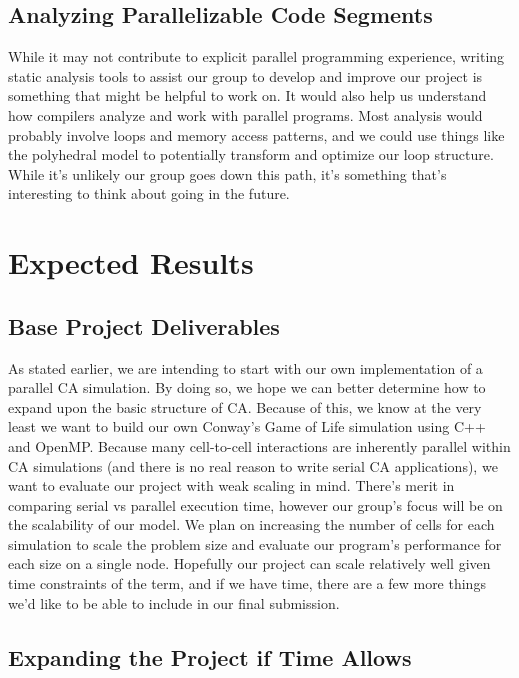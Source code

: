 \documentclass[12pt]{article}
\begin{document}
\par
\subsection{Analyzing Parallelizable Code Segments}
While it may not contribute to explicit parallel programming experience, writing static analysis tools to assist our group to develop and improve our project is something that might be helpful to work on. It would also help us understand how compilers analyze and work with parallel programs. Most analysis would probably involve loops and memory access patterns, and we could use things like the polyhedral model to potentially transform and optimize our loop structure. While it's unlikely our group goes down this path, it's something that's interesting to think about going in the future.

\par
\section{Expected Results}
\subsection{Base Project Deliverables}
As stated earlier, we are intending to start with our own implementation of a parallel CA simulation. By doing so, we hope we can better determine how to expand upon the basic structure of CA. Because of this, we know at the very least we want to build our own Conway's Game of Life simulation using C++ and OpenMP. Because many cell-to-cell interactions are inherently parallel within CA simulations (and there is no real reason to write serial CA applications), we want to evaluate our project with weak scaling in mind. There's merit in comparing serial vs parallel execution time, however our group's focus will be on the scalability of our model. We plan on increasing the number of cells for each simulation to scale the problem size and evaluate our program's performance for each size on a single node. Hopefully our project can scale relatively well given time constraints of the term, and if we have time, there are a few more things we'd like to be able to include in our final submission.

\par
\subsection{Expanding the Project if Time Allows}
\end{document}
